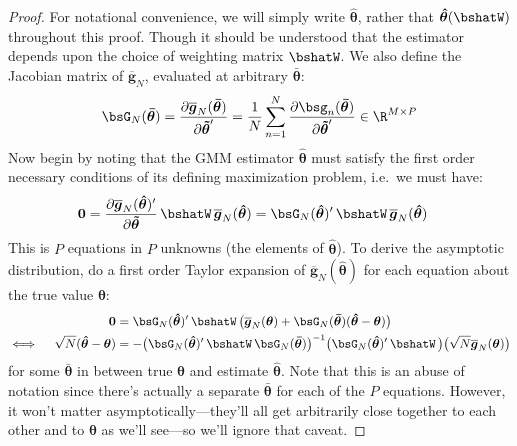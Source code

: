 \documentclass[12pt]{article}
\theoremstyle{plain}
\theoremstyle{definition}
\theoremstyle{remark}
\newcommand{\bstheta}{\boldsymbol{\theta}}
\newcommand{\bshattheta}{\boldsymbol{\hat{\theta}}}
\newcommand{\bsbartheta}{\boldsymbol{\bar{\theta}}}
\newcommand{\bstildetheta}{\boldsymbol{\tilde{\theta}}}
\newcommand{\bsbarg}{\boldsymbol{\overline{g}}}
\renewcommand{\bso}{\boldsymbol{0}}
\newcommand{\sumnN}{\sum^N_{n=1}}
\begin{document}
\begin{proof}
For notational convenience, we will simply write $\bshattheta$, rather
that $\bshattheta(\bshatW)$ throughout this proof. Though it should be
understood that the estimator depends upon the choice of weighting
matrix $\bshatW$.
We also define the Jacobian matrix of $\bsbarg_N$, evaluated at arbitrary
$\bsbartheta$:
\begin{align*}
  \bsG_N(\bsbartheta)
  =
  \frac{\partial \bsbarg_N(\bsbartheta)}{\partial \bstildetheta'}
  =
  \frac{1}{N}
  \sumnN
  \frac{\partial \bsg_n(\bsbartheta)}{\partial \bstildetheta'}
  \in \R^{M\times P}
\end{align*}
Now begin by noting that the GMM estimator $\bshattheta$ must satisfy
the first order necessary conditions of its defining maximization
problem, i.e.\ we must have:
\begin{align*}
  \bso &=
  \frac{\partial \bsbarg_N(\bshattheta)'}{\partial \bstildetheta}
  \, \bshatW \, \bsbarg_N(\bshattheta)
  =
  \bsG_N(\bshattheta)'
  \, \bshatW \, \bsbarg_N(\bshattheta)
\end{align*}
This is $P$ equations in $P$ unknowns (the elements of $\bshattheta$).
To derive the asymptotic distribution, do a first order Taylor expansion
of $\bsbarg_N(\bshattheta)$ for each equation about the true value
$\bstheta$:
\begin{align}
  \bso &=
  \bsG_N(\bshattheta)'
  \, \bshatW \,
  \big(
  \bsbarg_N(\bstheta)
  +
  \bsG_N(\bsbartheta)
  (\bshattheta-\bstheta)
  \big)
  \notag
  \\
  \iff\quad
  \sqrt{N}(\bshattheta-\bstheta)
  &=
  -
  \big(
  \bsG_N(\bshattheta)'
  \, \bshatW \,
  \bsG_N(\bsbartheta)
  \big)^{-1}
  \big(
  \bsG_N(\bshattheta)'
  \, \bshatW \,
  \big)
  \big(
  \sqrt{N}
  \bsbarg_N(\bstheta)
  \big)
  \label{gmm:proof}
\end{align}
for some $\bsbartheta$ in between true $\bstheta$ and estimate
$\bshattheta$. Note that this is an abuse of notation since there's
actually a separate $\bsbartheta$ for each of the $P$ equations.
However, it won't matter asymptotically---they'll all get arbitrarily
close together to each other and to $\bstheta$ as we'll see---so we'll
ignore that caveat.


\end{proof}
\end{document}
